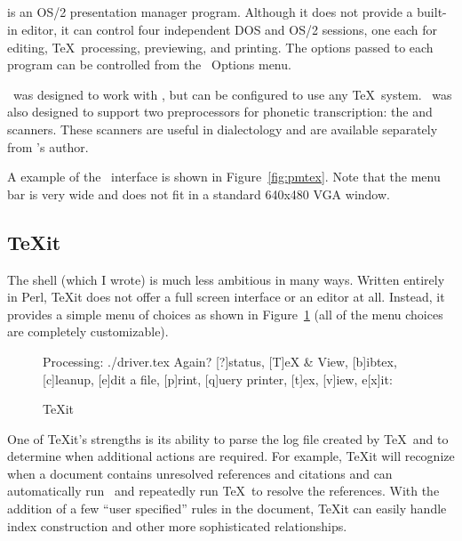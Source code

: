 
\subsection{\protect\PMTeX}

 is an OS/2 presentation manager program.  Although it does not 
provide a built-in editor, it can control four independent DOS and OS/2
sessions, one each for editing, \TeX\ processing, previewing, and 
printing.  The options passed to each program can be controlled from
the \PMTeX\ Options menu.

\PMTeX\ was designed to work with \emTeX, but can be configured to use
any \TeX\ system.  \PMTeX\ was also designed to support two preprocessors
for phonetic transcription: 
the  and  scanners.  These
scanners are useful in dialectology and are available separately from
\PMTeX's author.

A example of the \PMTeX\ interface is shown in Figure~\ref{fig:pmtex}.
Note that the menu bar is very wide and does not fit in a standard 640x480
VGA window.


\subsection{\protect\TeX{}it}

The  shell (which I wrote) is much less ambitious in many ways.
Written entirely in Perl, \TeX{}it does not offer a full screen interface
or an editor at all.  Instead, it provides a simple menu of choices as
shown in Figure~\ref{fig:texit} (all of the menu choices are completely 
customizable).

\begin{figure}
\begin{FramedVerbSmall}
Processing: ./driver.tex
Again? [?]status, [T]eX & View, [b]ibtex, [c]leanup, 
       [e]dit a file, [p]rint, [q]uery printer, [t]ex, 
       [v]iew, e[x]it: 
\end{FramedVerbSmall}
\caption{\TeX{}it}
\label{fig:texit}
\end{figure}

One of \TeX{}it's strengths is its ability to parse the log file created
by \TeX\ and to determine when additional actions are required.  For example,
\TeX{}it will recognize when a document contains unresolved references
and citations and can automatically run \BibTeX\ and repeatedly run
\TeX\ to resolve the references.  With the addition of a few ``user specified''
rules in the document, \TeX{}it can easily handle index construction and
other more sophisticated relationships.


